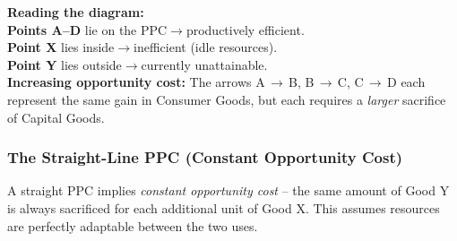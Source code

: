 \documentclass[11pt, a4paper, twoside]{book}
\begin{document}
\begin{diagrambox}
{%
}{%
\textbf{\color{CurveNavy}Reading the diagram:}\\[7pt]
\textbf{Points A--D} lie on the PPC\enspace$\rightarrow$\enspace productively efficient.\\[5pt]
\textbf{Point X} lies inside\enspace$\rightarrow$\enspace inefficient (idle resources).\\[5pt]
\textbf{Point Y} lies outside\enspace$\rightarrow$\enspace currently unattainable.\\[10pt]
\textbf{\color{CurveGold}Increasing opportunity cost:} The arrows A$\,\to\,$B, B$\,\to\,$C, C$\,\to\,$D each represent the same gain in Consumer Goods, but each requires a \emph{larger} sacrifice of Capital Goods.%
}
\end{diagrambox}

\subsubsection{The Straight-Line PPC (Constant Opportunity Cost)}

A straight PPC implies \emph{constant opportunity cost} -- the same amount of Good Y is always sacrificed for each additional unit of Good X. This assumes resources are perfectly adaptable between the two uses.
\end{document}

